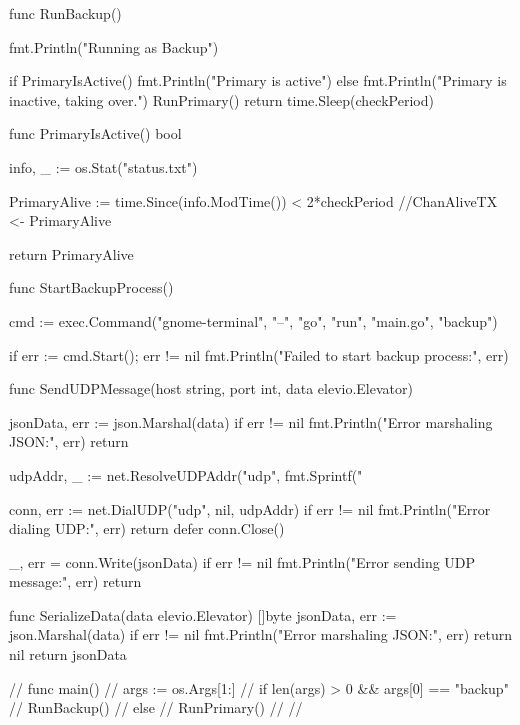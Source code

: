func RunBackup() {
    fmt.Println("Running as Backup")
    
        if PrimaryIsActive() {
            fmt.Println("Primary is active")
        } else {
            fmt.Println("Primary is inactive, taking over.")
            RunPrimary()
            return
        }
        time.Sleep(checkPeriod)
}

func PrimaryIsActive() bool {
    info, _ := os.Stat("status.txt")

	PrimaryAlive := time.Since(info.ModTime()) < 2*checkPeriod
	//ChanAliveTX <- PrimaryAlive

    return PrimaryAlive
}

func StartBackupProcess() {
    cmd := exec.Command("gnome-terminal", "--", "go", "run", "main.go", "backup")

    if err := cmd.Start(); err != nil {
        fmt.Println("Failed to start backup process:", err)
    }
}

func SendUDPMessage(host string, port int, data elevio.Elevator) {
    jsonData, err := json.Marshal(data)
    if err != nil {
        fmt.Println("Error marshaling JSON:", err)
        return
    }

    udpAddr, _ := net.ResolveUDPAddr("udp", fmt.Sprintf("%

    conn, err := net.DialUDP("udp", nil, udpAddr)
    if err != nil {
        fmt.Println("Error dialing UDP:", err)
        return
    }
    defer conn.Close()

    _, err = conn.Write(jsonData)
    if err != nil {
        fmt.Println("Error sending UDP message:", err)
        return
    }
}

func SerializeData(data elevio.Elevator) []byte {
    jsonData, err := json.Marshal(data)
    if err != nil {
        fmt.Println("Error marshaling JSON:", err)
        return nil
    }
    return jsonData
}

// func main() {
//     args := os.Args[1:]
//     if len(args) > 0 && args[0] == "backup" {
//         RunBackup()
//     } else {
//         RunPrimary()
//     }
// }

